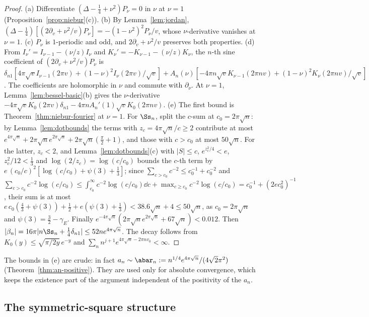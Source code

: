 \begin{proof}
(a) Differentiate $(\Delta-\frac14+\nu^2)P_\nu=0$ in $\nu$ at $\nu=1$ (Proposition~\ref{prop:niebur}(c)). (b) By Lemma~\ref{lem:jordan},
$(\Delta-\frac14)[(2\partial_v+\nu^2/v)P_\nu]=-(1-\nu^2)^2P_\nu/v$, whose $\nu$-derivative vanishes at $\nu=1$. (c) $P_\nu$ is $1$-periodic and odd,
and $2\partial_v+\nu^2/v$ preserves both properties. (d) From $I_\nu'=I_{\nu-1}-(\nu/z)I_\nu$ and $K_\nu'=-K_{\nu-1}-(\nu/z)K_\nu$, the $n$-th sine
coefficient of $(2\partial_v+\nu^2/v)P_\nu$ is
$\delta_{n1}[4\pi\sqrt vI_{\nu-1}(2\pi v)+(1-\nu)^2I_\nu(2\pi v)/\sqrt v]+A_n(\nu)[-4\pi n\sqrt vK_{\nu-1}(2\pi nv)+(1-\nu)^2K_\nu(2\pi nv)/\sqrt v]$.
The coefficients are holomorphic in $\nu$ and commute with $\partial_\nu$. At $\nu=1$, Lemma~\ref{lem:bessel-basic}(b) gives the $\nu$-derivative
$-4\pi\sqrt vK_0(2\pi v)\delta_{n1}-4\pi nA_n'(1)\sqrt vK_0(2\pi nv)$. (e) The first bound is Theorem~\ref{thm:niebur-fourier} at $\nu=1$. For
$\Ss_n$, split the $c$-sum at $c_0=2\pi\sqrt n$: by Lemma~\ref{lem:dotbounds} the terms with $z_c=4\pi\sqrt n/c\ge2$ contribute at most
$e^{4\pi\sqrt n}+2\pi\sqrt ne^{2\pi\sqrt n}+2\pi\sqrt n(\frac\pi2+1)$, and those with $c>c_0$ at most $50\sqrt n$. For the latter,
$z_c<2$, and Lemma~\ref{lem:dotbounds}(c) with $|S|\le c$, $e^{z_c^2/4}<e$, $z_c^2/12<\frac13$ and $\log(2/z_c)=\log(c/c_0)$ bounds the $c$-th
term by $e\,(c_0/c)^2[\log(c/c_0)+\psi(3)+\frac13]$; since $\sum_{c>c_0}c^{-2}\le c_0^{-1}+c_0^{-2}$ and
$\sum_{c>c_0}c^{-2}\log(c/c_0)\le\int_{c_0}^\infty c^{-2}\log(c/c_0)\dd c+\max_{c\ge c_0}c^{-2}\log(c/c_0)=c_0^{-1}+(2ec_0^2)^{-1}$, their sum is
at most $e\,c_0(\frac43+\psi(3))+\frac12+e(\psi(3)+\frac13)<38.6\sqrt n+4\le50\sqrt n$, as $c_0=2\pi\sqrt n$ and $\psi(3)=\frac32-\gamma_E$. Finally
$e^{-4\pi\sqrt n}(2\pi\sqrt ne^{2\pi\sqrt n}+67\sqrt n)<0.012$. Then $|\beta_n|=16\pi|n\Ss_n+\frac14\delta_{n1}|\le52ne^{4\pi\sqrt n}$. The decay
follows from $K_0(y)\le\sqrt{\pi/2y}\,e^{-y}$ \cite[\S10.40(ii)]{DLMF} and $\sum_nn^{j+1}e^{4\pi\sqrt n-2\pi n v_0}<\infty$.
\end{proof}

The bounds in (e) are crude: in fact $a_n\sim\abar_n:=n^{1/4}e^{4\pi\sqrt n}/(4\sqrt2\pi^2)$ (Theorem~\ref{thm:an-positive}). They are used only
for absolute convergence, which keeps the existence part of the argument independent of the positivity of the $a_n$.

\subsection{The symmetric-square structure}

